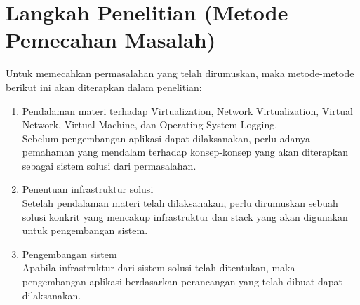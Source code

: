 



\section{Langkah Penelitian (Metode Pemecahan Masalah)}
\label{sec:langkahPenelitian}
Untuk memecahkan permasalahan yang telah dirumuskan, maka metode-metode berikut ini akan diterapkan dalam penelitian:
\begin{enumerate}
	\item Pendalaman materi terhadap Virtualization, Network Virtualization, Virtual Network, Virtual Machine, dan Operating System Logging. \\
	Sebelum pengembangan aplikasi dapat dilaksanakan, perlu adanya pemahaman yang mendalam terhadap konsep-konsep yang akan diterapkan sebagai sistem solusi dari permasalahan.
	\item Penentuan infrastruktur solusi \\
	Setelah pendalaman materi telah dilaksanakan, perlu dirumuskan sebuah solusi konkrit yang mencakup infrastruktur dan stack yang akan digunakan untuk pengembangan sistem.
	\item Pengembangan sistem \\
	Apabila infrastruktur dari sistem solusi telah ditentukan, maka pengembangan aplikasi berdasarkan perancangan yang telah dibuat dapat dilaksanakan.
\end{enumerate}


